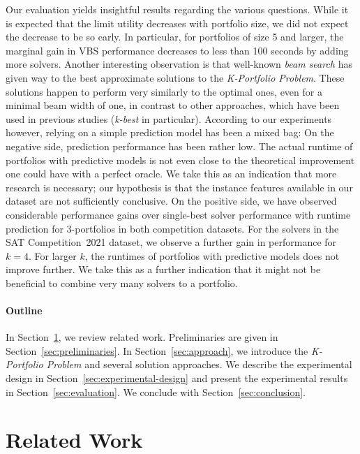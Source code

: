 \documentclass[conference]{IEEEtran}
\begin{document}
Our evaluation yields insightful results regarding the various questions. 
While it is expected that the limit utility decreases with portfolio size, we did not expect the decrease to be so early. 
In particular, for portfolios of size 5 and larger, the marginal gain in VBS performance decreases to less than 100 seconds by adding more solvers.  
Another interesting observation is that well-known \emph{beam search} has given way to the best approximate solutions to the \emph{K-Portfolio Problem}. 
These solutions happen to perform very similarly to the optimal ones, even for a minimal beam width of one, in contrast to other approaches, which have been used in previous studies (\emph{k-best} in particular). 
According to our experiments however, relying on a simple prediction model has been a mixed bag:
On the negative side, prediction performance has been rather low. 
The actual runtime of portfolios with predictive models is not even close to the theoretical improvement one could have with a perfect oracle.
We take this as an indication that more research is necessary; our hypothesis is that the instance features available in our dataset are not sufficiently conclusive. 
On the positive side, we have observed considerable performance gains over single-best solver performance with runtime prediction for $3$-portfolios in both competition datasets. 
For the solvers in the SAT Competition~2021 dataset, we observe a further gain in performance for $k = 4$. 
For larger $k$, the runtimes of portfolios with predictive models does not improve further. 
We take this as a further indication that it might not be beneficial to combine very many solvers to a portfolio. 

\paragraph{Outline}

In Section~\ref{sec:related-work}, we review related work. 
Preliminaries are given in Section~\ref{sec:preliminaries}. 
In Section~\ref{sec:approach}, we introduce the \emph{K-Portfolio Problem} and several solution approaches. 
We describe the experimental design in Section~\ref{sec:experimental-design} and present the experimental results in Section~\ref{sec:evaluation}. 
We conclude with Section~\ref{sec:conclusion}. 

\section{Related Work}
\label{sec:related-work}
\end{document}
